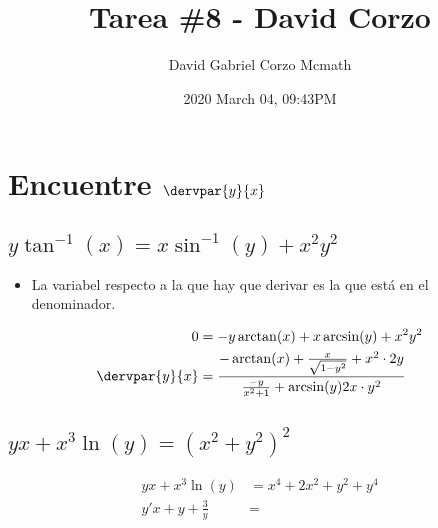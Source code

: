 \documentclass{article}
\title{Tarea \#8 - David Corzo}
\date{2020 March 04, 09:43PM}
\author{David Gabriel Corzo Mcmath}
\begin{document}
\maketitle

\section{Encuentre $\displaystyle \dervpar{y}{x}$}
\subsection{$\displaystyle y\tan^{-1}(x)=x\sin^{-1}(y)+x^2y^2$}  

\begin{center}
    \begin{itemize}[label=\#]
        \item La variabel respecto a la que hay que derivar es la que está en el denominador.
    \end{itemize}
    \begin{center}
       \begin{align*}
            0 &= -y \arctan (x)+x\arcsin(y)+x^2y^2\\ 

            \dervpar{y}{x} &= \frac{-\arctan(x) + \frac{x}{\sqrt{1-y^2}} + x^2\cdot 2y}{\frac{-y}{x^2+1} + \arcsin(y) 2x\cdot y^2}  \\ 
       \end{align*}
    \end{center}
\end{center}
\subsection{$\displaystyle yx+x^3\ln(y)=\left(x^2+y^2\right)^2$}

\begin{center}
   \begin{align*}
        yx+x^3\ln(y) &= x^4 + 2x^2+y^2 + y^4 \\ 
        y'x+y+\frac{3}{y} &= 
   \end{align*}
\end{center}
\end{document}
